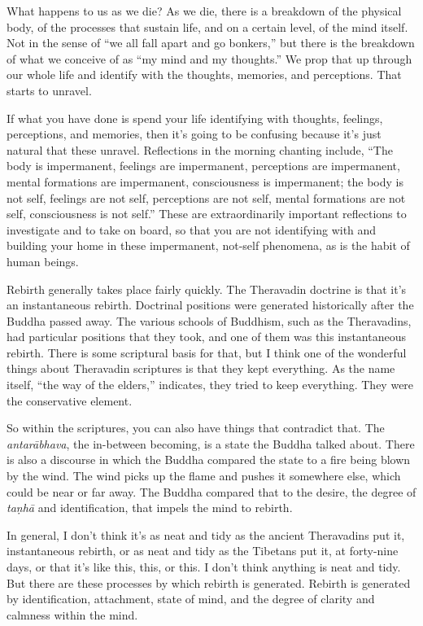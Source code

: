 What happens to us as we die? As we die, there is a breakdown of the
physical body, of the processes that sustain life, and on a certain
level, of the mind itself. Not in the sense of “we all fall apart and go
bonkers,” but there is the breakdown of what we conceive of as “my mind
and my thoughts.” We prop that up through our whole life and identify
with the thoughts, memories, and perceptions. That starts to unravel.

If what you have done is spend your life identifying with thoughts,
feelings, perceptions, and memories, then it’s going to be confusing
because it’s just natural that these unravel. Reflections in the morning
chanting include, “The body is impermanent, feelings are impermanent,
perceptions are impermanent, mental formations are impermanent,
consciousness is impermanent; the body is not self, feelings are not
self, perceptions are not self, mental formations are not self,
consciousness is not self.” These are extraordinarily important
reflections to investigate and to take on board, so that you are not
identifying with and building your home in these impermanent, not-self
phenomena, as is the habit of human beings.

Rebirth generally takes place fairly quickly. The Theravadin doctrine is
that it’s an instantaneous rebirth. Doctrinal positions were generated
historically after the Buddha passed away. The various schools of
Buddhism, such as the Theravadins, had particular positions that they
took, and one of them was this instantaneous rebirth. There is some
scriptural basis for that, but I think one of the wonderful things about
Theravadin scriptures is that they kept everything. As the name itself,
“the way of the elders,” indicates, they tried to keep everything. They
were the conservative element.

So within the scriptures, you can also have things that contradict that.
The \emph{antarābhava}, the in-between becoming, is a state the Buddha
talked about. There is also a discourse in which the Buddha compared the
state to a fire being blown by the wind. The wind picks up the flame and
pushes it somewhere else, which could be near or far away. The Buddha
compared that to the desire, the degree of \emph{taṇhā} and
identification, that impels the mind to rebirth.

In general, I don’t think it’s as neat and tidy as the ancient
Theravadins put it, instantaneous rebirth, or as neat and tidy as the
Tibetans put it, at forty-nine days, or that it’s like this, this, or
this. I don’t think anything is neat and tidy. But there are these
processes by which rebirth is generated. Rebirth is generated by
identification, attachment, state of mind, and the degree of clarity and
calmness within the mind.

